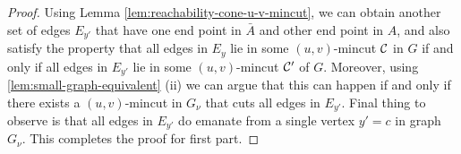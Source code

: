 \begin{proof}
Using Lemma \ref{lem:reachability-cone-u-v-mincut}, we can obtain another set of edges $E_{y'}$ that have one end point in ${\bar A}$ and other end point in $A$, and also satisfy the property that all edges in $E_y$ lie in some $(u,v)$-mincut ${\cal C}$ in $G$ if and only if all edges in $E_{y'}$ lie in some $(u,v)$-mincut ${\cal C}'$ of $G$. Moreover, using \ref{lem:small-graph-equivalent} (ii) we can argue that this can happen if and only if there exists a $(u,v)$-mincut in $G_\nu$ that cuts all edges in $E_{y'}$. Final thing to observe is that all edges in $E_{y'}$ do emanate from a single vertex $y'=c$ in graph $G_\nu$. This completes the proof for first part.





\end{proof}
